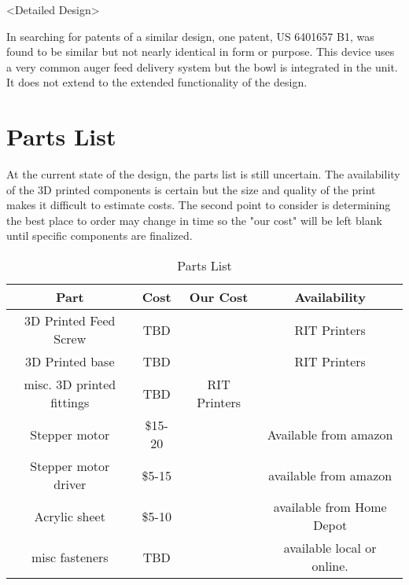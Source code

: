 \documentclass[12pt]{article}
\begin{document}
<Detailed Design>

In searching for patents of a similar design, one patent, US 6401657 B1, was found to be similar but not nearly identical in form or purpose. This device uses a very common auger feed delivery system but the bowl is integrated in the unit. It does not extend to the extended functionality of the design. 

\section{Parts List}
    At the current state of the design, the parts list is still uncertain. The availability of the 3D printed
    components is certain but the size and quality of the print makes it difficult to estimate costs. 
    The second point to consider is determining the best place to order may change in time so the "our cost" 
    will be left blank until specific components are finalized.
    \begin{table}[h]
\caption{Parts List} %
\centering %
\begin{tabular}{c c c c} %
\hline\hline %
    Part & Cost & Our Cost & Availability \\ %
\hline %
    3D Printed Feed Screw & TBD& & RIT Printers \\
    3D Printed base & TBD& & RIT Printers\\
    misc. 3D printed fittings & TBD&RIT Printers & \\
    Stepper motor & \$15-20 & & Available from amazon \\
    Stepper motor driver & \$5-15 & & available from amazon \\
    Acrylic sheet & \$5-10 & & available from Home Depot \\
    misc fasteners & TBD & & available local or online. \\

    \hline %
\end{tabular}
\label{table:bom} %
\end{table}
\end{document}
